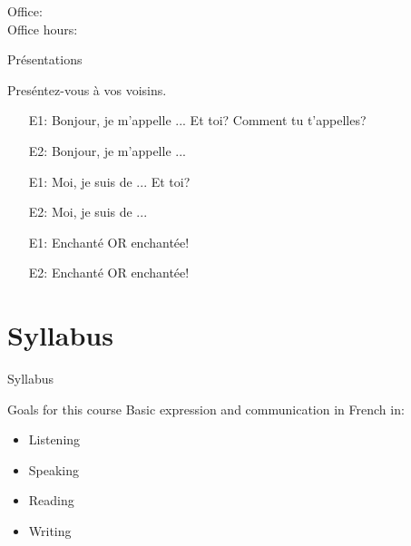 \documentclass{beamer}
\subtitle[Bienvenue]{Bienvenue}
\begin{document}
  \begin{frame}
    \titlepage
    \tiny{Office: \\
          Office hours: }
  \end{frame}

  \begin{frame}{Présentations}
    \begin{center}
      Preséntez-vous à vos voisins.\\
    \end{center}
    \begin{itemize}
      \item[E1:] Bonjour, je m'appelle ... Et toi? Comment tu t'appelles?
      \item[E2:] Bonjour, je m'appelle ...
      \item[E1:] Moi, je suis de ... Et toi?
      \item[E2:] Moi, je suis de ...
      \item[E1:] Enchanté OR enchantée!
      \item[E2:] Enchanté OR enchantée!
    \end{itemize}
  \end{frame}

  \section{Syllabus}
  \begin{frame}
    \begin{center}
      \Huge{Syllabus}
    \end{center}
  \end{frame}

  \begin{frame}{Goals for this course}
    Basic expression and communication in French in:
    \begin{itemize}
      \item Listening
      \item Speaking
      \item Reading
      \item Writing
    \end{itemize}
  \end{frame}
\end{document}
